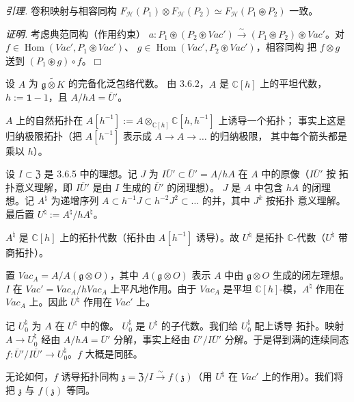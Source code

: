  \emph{引理.} 卷积映射与相容同构
$F_{\mathcal{H}}(P_1)\otimes F_{\mathcal{H}}(P_2)\simeq
F_{\mathcal{H}}(P_1\circledast P_2)$ 一致。

\emph{证明.} 考虑典范同构（作用约束）
$a:P_1\circledast(P_2\circledast\mathit{Vac}')\xrightarrow{\sim}
(P_1\circledast P_2)\circledast\mathit{Vac}'$。对
$f\in\operatorname{Hom}(\mathit{Vac}',P_1\circledast\mathit{Vac}')$、
$g\in\operatorname{Hom}(\mathit{Vac}',P_2\circledast\mathit{Vac}')$，相容同构
把 $f\otimes g$ 送到 $(P_1\circledast g)\circ f$。\hfill$\Box$


 设 $A$ 为 $\widetilde{\mathfrak{g}\otimes K}$ 的完备化泛包络代数。
由 3.6.2，$A$ 是 $\mathbb{C}[h]$ 上的平坦代数，$h:=\mathbf{1}-1$，且
$A/hA=\overline{U}'$。

$A$ 上的自然拓扑在
$A[h^{-1}]:=A\otimes_{\mathbb{C}[h]}\mathbb{C}[h,h^{-1}]$ 上诱导一个拓扑；
事实上这是归纳极限拓扑（把 $A[h^{-1}]$ 表示成 $A\to A\to\ldots$ 的归纳极限，
其中每个箭头都是乘以 $h$）。

设 $I\subset\mathfrak{Z}$ 是 3.6.5 中的理想。记 $J$ 为
$I\overline{U}'\subset\overline{U}'=A/hA$ 在 $A$ 中的原像（$I\overline{U}'$ 按
拓扑意义理解，即 $I\overline{U}'$ 是由 $I$ 生成的 $\overline{U}'$ 的闭理想）。
$J$ 是 $A$ 中包含 $hA$ 的闭理想。记 $A^{\natural}$ 为递增序列
$A\subset h^{-1}J\subset h^{-2}J^{2}\subset\ldots$ 的并，其中 $J^{k}$ 按拓扑
意义理解。最后置 $U^{\natural}:=A^{\natural}/hA^{\natural}$。


$A^{\natural}$ 是 $\mathbb{C}[h]$ 上的拓扑代数（拓扑由 $A[h^{-1}]$ 诱导）。故
$U^{\natural}$ 是拓扑 $\mathbb{C}$-代数（$U^{\natural}$ 带商拓扑）。

 置 $\mathit{Vac}_A=A/A(\mathfrak{g}\otimes O)$，其中
$A(\mathfrak{g}\otimes O)$ 表示 $A$ 中由 $\mathfrak{g}\otimes O$ 生成的闭左理想。
$I$ 在 $\mathit{Vac}'=\mathit{Vac}_A/h\mathit{Vac}_A$ 上平凡地作用。由于
$\mathit{Vac}_A$ 是平坦 $\mathbb{C}[h]$-模，$A^{\natural}$ 作用在
$\mathit{Vac}_A$ 上。因此 $U^{\natural}$ 作用在 $\mathit{Vac}'$ 上。

 记 $U^{\natural}_0$ 为 $A$ 在 $U^{\natural}$ 中的像。
$U^{\natural}_0$ 是 $U^{\natural}$ 的子代数。我们给 $U^{\natural}_0$ 配上诱导
拓扑。映射 $A\to U^{\natural}_0$ 经由 $A/hA=\overline{U}'$ 分解，事实上经由
$\overline{U}'/I\overline{U}'$ 分解。于是得到满的连续同态
$f:\overline{U}'/I\overline{U}'\to U^{\natural}_0$。$f$ 大概是同胚。

无论如何，$f$ 诱导拓扑同构
$\mathfrak{z}=\mathfrak{Z}/I\xrightarrow{\sim}f(\mathfrak{z})$（用
$U^{\natural}$ 在 $\mathit{Vac}'$ 上的作用）。我们将把 $\mathfrak{z}$ 与
$f(\mathfrak{z})$ 等同。

